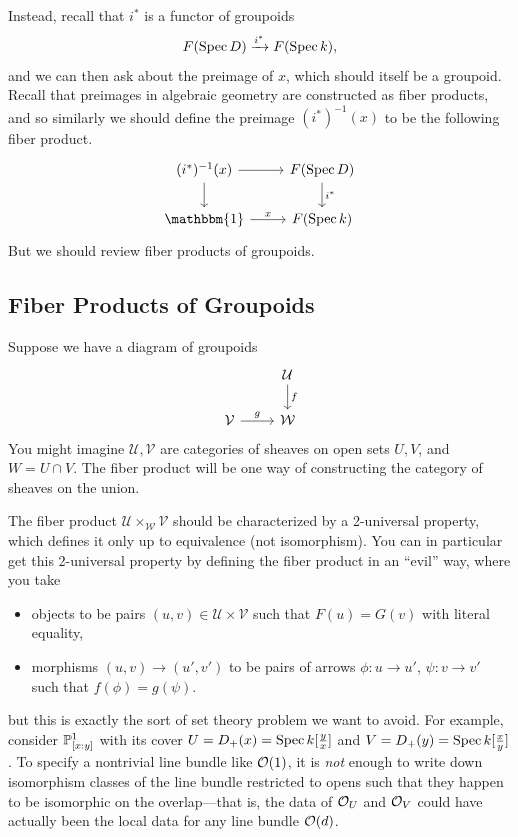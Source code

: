 \documentclass[12pt]{article}
\begin{document}
Instead, recall that $i^*$ is a functor of groupoids
\[F(\Spec D) \xrightarrow{i^*} F(\Spec k),\]
and we can then ask about the preimage of $x$, which should itself be a groupoid. Recall that preimages in algebraic geometry are constructed as fiber products, and so similarly we should define the preimage $(i^*)^{-1}(x)$ to be the following fiber product.
\[\begin{tikzcd}
    (i^*)^{-1}(x) \rar\dar & F(\Spec D) \dar["i^*"]\\
    \mathbbm{1} \rar["x"] & F(\Spec k)
\end{tikzcd}\]
But we should review fiber products of groupoids.

\subsection{Fiber Products of Groupoids}
Suppose we have a diagram of groupoids
\[\begin{tikzcd}
    & \mathcal{U} \dar["f"]\\
    \mathcal{V} \rar["g"] & \mathcal{W}
\end{tikzcd}\]
You might imagine $\mathcal{U},\mathcal{V}$ are categories of sheaves on open sets $U,V$, and $W = U \cap V$. The fiber product will be one way of constructing the category of sheaves on the union.

The fiber product $\mathcal{U} \times_{\mathcal{W}} \mathcal{V}$ should be characterized by a 2-universal property, which defines it only up to equivalence (not isomorphism). You can in particular get this 2-universal property by defining the fiber product in an ``evil'' way, where you take
\begin{itemize}
    \item objects to be pairs $(u,v) \in \mathcal{U}\times \mathcal{V}$ such that $F(u)=G(v)$ with literal equality,
    \item morphisms $(u,v) \to (u',v')$ to be pairs of arrows $\phi:u\to u'$, $\psi:v\to v'$ such that $f(\phi)=g(\psi)$.
\end{itemize}
but this is exactly the sort of set theory problem we want to avoid. For example, consider $\P^1_{[x:y]}$ with its cover $U=D_+(x)=\Spec k[\frac{y}{x}]$ and $V=D_+(y)=\Spec k[\frac{x}{y}]$. To specify a nontrivial line bundle like $\cO(1)$, it is \textit{not} enough to write down isomorphism classes of the line bundle restricted to opens such that they happen to be isomorphic on the overlap---that is, the data of $\cO_U$ and $\cO_V$ could have actually been the local data for any line bundle $\cO(d)$.
\end{document}
